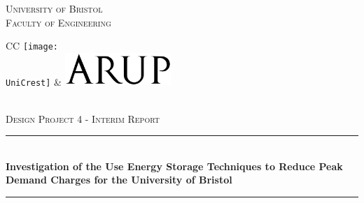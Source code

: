 \documentclass[10pt]{article}
\newcommand{\AssignmentTitle}{Investigation of the Use Energy Storage Techniques to Reduce Peak Demand Charges for the University of Bristol}
\newcommand{\ModuleTitle}{Design Project 4 - Interim Report}
\newcommand{\University}{University of Bristol}
\newcommand{\Faculty}{Faculty of Engineering}
\newcommand{\UniCrest}{crestbris.png}
\newcommand{\horrule}[1]{\rule{\linewidth}{#1}}
\begin{document}
  \setlength{\abovedisplayskip}{-18pt}
  \setlength{\belowdisplayskip}{0pt}
  \setlength{\abovedisplayshortskip}{-18pt}
  \setlength{\belowdisplayshortskip}{0pt}

\begin{titlepage}

	\center %
		\normalfont \normalsize \textsc{\University} \\ [10pt]
		\normalfont \normalsize \textsc{\Faculty} \\ [25pt]
\begin{tabular}{CC}
  \texttt{[image: \\UniCrest]} &   \includegraphics[width=0.3\textwidth]{Arup_logo.png}
\end{tabular}\\[0.5cm]
		\normalfont \normalsize \textsc{\ModuleTitle} \\ [25pt]
		\horrule{0.5pt} \\[0.4cm]
		\huge \textbf{\AssignmentTitle} \\
		\horrule{2pt} \\[0.5cm]

\end{titlepage}
\end{document}
